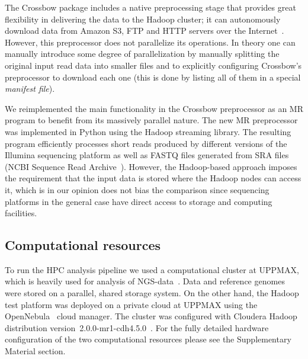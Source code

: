 \documentclass[10pt]{article}
\newcommand{\Fixme}[1]{{\color{FixmeColor}{#1}}}
\begin{document}
The Crossbow package includes a native preprocessing stage that provides great
flexibility in delivering the data to the Hadoop cluster; it can autonomously
download data from Amazon S3, FTP and HTTP servers over the
Internet~\cite{Langmead:2009kx}. However, this preprocessor does not parallelize
its operations. In theory one can manually introduce some degree of
parallelization by manually splitting the original input read data into smaller
files and to explicitly configuring Crossbow's preprocessor to download each one
(this is done by listing all of them in a special \textit{manifest file}).

We reimplemented the main functionality in the Crossbow preprocessor as an MR
program to benefit from its massively parallel nature. The new MR preprocessor
was implemented in Python using the Hadoop streaming library.
The resulting program efficiently processes short reads produced by different
versions of the Illumina sequencing platform as well as FASTQ files generated
from SRA files (NCBI Sequence Read Archive~\cite{ncbi-sra}). However, the
Hadoop-based approach imposes the requirement that the input data is stored
where the Hadoop nodes can access it, which is in our opinion does not bias the comparison since
sequencing platforms in the general case have direct access to storage and
computing facilities.


\subsection*{Computational resources}
To run the HPC analysis pipeline we used a computational cluster at UPPMAX,
which is heavily used for analysis of NGS-data~\cite{lampa}.
Data and reference genomes were stored on a parallel, shared storage system.
On the other hand, the Hadoop test platform was deployed on a private cloud at
UPPMAX using the OpenNebula~\cite{opennebula} cloud manager. The cluster was
configured with Cloudera Hadoop distribution version~2.0.0-mr1-cdh4.5.0~\cite{cloudera}.
For the fully detailed hardware configuration of the two computational resources
please see the Supplementary Material section.



\end{document}
